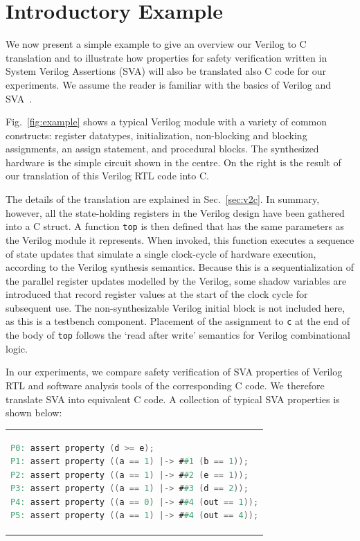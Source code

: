 \section{Introductory Example} 

We now present a simple example to give an overview our Verilog to C translation and to illustrate how properties for safety verification written in System Verilog Assertions (SVA) will also be translated also C code for our experiments. We assume the reader is familiar with the basics of Verilog and SVA~\cite{verilog}. 

Fig.~\ref{fig:example} shows a typical Verilog module with a variety of common constructs: register datatypes, initialization, non-blocking and blocking assignments, an assign statement, and procedural blocks.  The synthesized hardware is the simple circuit shown in the centre.  On the right is the result of our translation of this Verilog RTL code into C.

The details of the translation are explained in Sec.~\ref{sec:v2c}. In summary, however, all the state-holding registers in the Verilog design have been gathered into a C struct. A function \texttt{top} is then defined that has the same parameters as the Verilog module it represents. When invoked, this function executes a sequence of state updates that simulate a single clock-cycle of hardware execution, according to the Verilog synthesis semantics. Because this is a sequentialization of the parallel register updates modelled by the Verilog, some shadow variables are introduced that record register values at the start of the clock cycle for subsequent use.  The non-synthesizable Verilog initial block is not included here, as this is a testbench component.  Placement of the assignment to \texttt{c} at the end of the body of \texttt{top} follows the `read after write' semantics for Verilog combinational logic.

In our experiments, we compare safety verification of SVA properties of Verilog RTL and software analysis tools of the corresponding C code. We therefore translate SVA into equivalent C code. A collection of typical SVA properties is shown below:

\begin{center}
\begin{tabular}[t]{@{}l@{}}
\begin{lstlisting}[mathescape=true,language=Verilog,basicstyle=\scriptsize\ttfamily]
P0: assert property (d >= e);
P1: assert property ((a == 1) |-> ##1 (b == 1));
P2: assert property ((a == 1) |-> ##2 (e == 1));
P3: assert property ((a == 1) |-> ##3 (d == 2));
P4: assert property ((a == 0) |-> ##4 (out == 1));
P5: assert property ((a == 1) |-> ##4 (out == 4));
\end{lstlisting}
\end{tabular}
\end{center}

